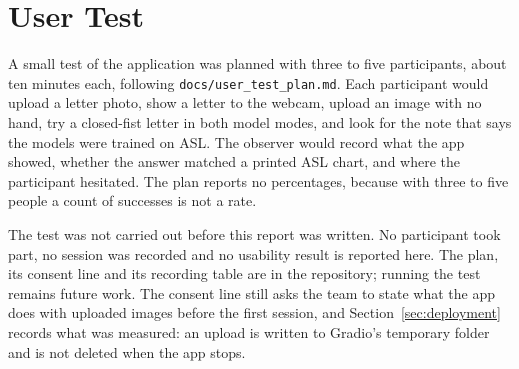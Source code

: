\section{User Test}
\label{sec:user-test}

A small test of the application was planned with three to five participants, about ten minutes each, following \texttt{docs/user\_test\_plan.md}. Each participant would upload a letter photo, show a letter to the webcam, upload an image with no hand, try a closed-fist letter in both model modes, and look for the note that says the models were trained on ASL. The observer would record what the app showed, whether the answer matched a printed ASL chart, and where the participant hesitated. The plan reports no percentages, because with three to five people a count of successes is not a rate.

The test was not carried out before this report was written. No participant took part, no session was recorded and no usability result is reported here. The plan, its consent line and its recording table are in the repository; running the test remains future work. The consent line still asks the team to state what the app does with uploaded images before the first session, and Section~\ref{sec:deployment} records what was measured: an upload is written to Gradio's temporary folder and is not deleted when the app stops.
